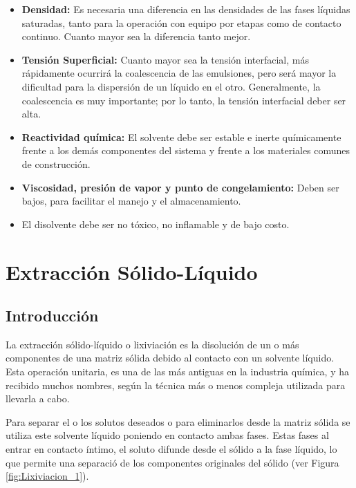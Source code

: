 \documentclass[11pt]{book}
\begin{document}
\begin{itemize}
    \item \textbf{Densidad:} Es necesaria una diferencia en las densidades de las fases líquidas saturadas, tanto para la operación con equipo por etapas como de contacto continuo. Cuanto mayor sea la diferencia tanto mejor.
    
    \item \textbf{Tensión Superficial:} Cuanto mayor sea la tensión interfacial, más rápidamente ocurrirá la coalescencia de las emulsiones, pero será mayor la dificultad para la dispersión de un líquido en el otro. Generalmente, la coalescencia es muy importante; por lo tanto, la tensión interfacial deber ser alta.
    
    \item \textbf{Reactividad química:} El solvente debe ser estable e inerte químicamente frente a los demás componentes del sistema y frente a los materiales comunes de construcción.
    
    \item \textbf{Viscosidad, presión de vapor y punto de congelamiento:} Deben ser bajos, para facilitar el manejo y el almacenamiento.
    
    \item El disolvente debe ser no tóxico, no inflamable y de bajo costo.
    
\end{itemize}


\chapter{Extracción Sólido-Líquido}

\section{Introducción}

La extracción sólido-líquido o lixiviación es la disolución de un o más componentes de una matriz sólida debido al contacto con un solvente líquido. Esta operación unitaria, es una de las más antiguas en la industria química, y ha recibido muchos nombres, según la técnica más o menos compleja utilizada para llevarla a cabo.

Para separar el o los solutos deseados o para eliminarlos desde la matriz sólida se utiliza este solvente líquido poniendo en contacto ambas fases. Estas fases al entrar en contacto íntimo, el soluto difunde desde el sólido a la fase líquido, lo que permite una separació de los componentes originales del sólido (ver Figura \ref{fig:Lixiviacion_1}).
\end{document}
